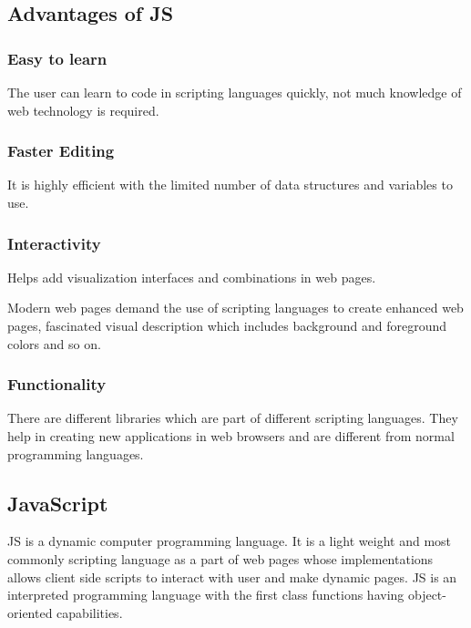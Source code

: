 \documentclass[a4paper]{article}
\begin{document}
  \subsection{Advantages of JS}%
    \subsubsection{Easy to learn}
    The user can learn to code in scripting languages quickly, not 
    much knowledge of web technology is required.

    \subsubsection{Faster Editing}
    It is highly efficient with the limited number of data structures 
    and variables to use.

    \subsubsection{Interactivity}
    Helps add visualization interfaces and combinations in web pages.

    Modern web pages demand the use of scripting languages to create 
    enhanced web pages, fascinated visual description which includes 
    background and foreground colors and so on.

    \subsubsection{Functionality}
    There are different libraries which are part of different 
    scripting languages.
    They help in creating new applications in web browsers and are 
    different from normal programming languages.%

  \subsection{JavaScript}%
  JS is a dynamic computer programming language. It is a light
  weight and most commonly scripting language as a part of web pages
  whose implementations allows client side scripts to interact with
  user and make dynamic pages. JS is an interpreted programming
  language with the first class functions having object-oriented
  capabilities.
\end{document}
